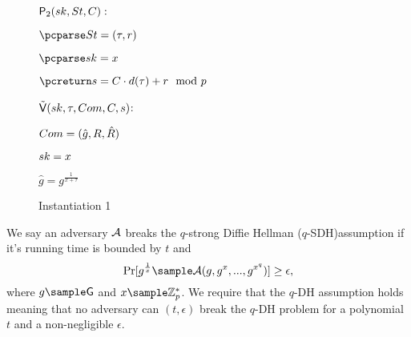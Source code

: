 \begin{figure}[htb!]
{\begin{minipage}[t]{0.5\textwidth}
              \underline{$\mathsf{P}_2(sk,St,C):$}
            \begin{nicodemus}
            	\item $\pcparse \st = (\tau,r)$
		\item $\pcparse \sk = x$
                \item $\pcreturn \s =\c\cdot d(\tau) + r \mod p$
            \end{nicodemus}
                        \underline{$\tilde{\mathsf{V}}(sk,\tau,Com, C,s)$}:
            \begin{nicodemus}
                \item \pcparse $Com = (\hat{g},R,\hat{R})$
                \item \pcparse $sk = x$
                \item \pcif $\hat{g} = g^{\frac{1}{x+\tau}}$ 
                \item \quad \pcthen {}
                \item \pcelse {}
            \end{nicodemus}
        \end{minipage}
    }
    \caption{Instantiation 1}
    \label{fig:prf-security}
\end{figure}

\begin{definition}[$q$-DH Assumption]
We say an adversary $\mathcal{A}$ breaks the $q$-strong Diffie Hellman ($q$-SDH)assumption if it's running time is bounded by $t$ and
$$\Pr[g^{\frac{1}{x}} \sample \adv(g,g^x,...,g^{x^q})] \geq \epsilon,$$
where 
$g \sample \G$ and $x \sample \mathbb{Z}_p^*$.
We require that the $q$-DH assumption holds meaning that no adversary can $(t, \epsilon)$ break the $q$-DH problem for a polynomial $t$ and a non-negligible $\epsilon$.
\end{definition}

